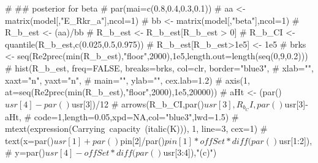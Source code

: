 \documentclass[
  11pt,
]{article}
\newenvironment{Shaded}{}{}
\newcommand{\CommentTok}[1]{\textcolor[rgb]{0.00,0.50,0.00}{#1}}
\begin{document}
\begin{Shaded}
\begin{Highlighting}[]
\CommentTok{# ## posterior for beta}
\CommentTok{# par(mai=c(0.8,0.4,0.3,0.1))}
\CommentTok{# aa <- matrix(model[,"E_Rkr_a"],ncol=1)}
\CommentTok{# bb <- matrix(model[,"beta"],ncol=1)}
\CommentTok{# R_b_est <- (aa)/bb}
\CommentTok{# R_b_est <- R_b_est[R_b_est > 0]}
\CommentTok{# R_b_CI <- quantile(R_b_est,c(0.025,0.5,0.975))}
\CommentTok{# R_b_est[R_b_est>1e5] <- 1e5}
\CommentTok{# brks <- seq(Re2prec(min(R_b_est),"floor",2000),1e5,length.out=length(seq(0,9,0.2)))}
\CommentTok{# hist(R_b_est, freq=FALSE, breaks=brks, col=clr, border="blue3",}
\CommentTok{#    xlab="", xaxt="n", yaxt="n",}
\CommentTok{#    main="", ylab="", cex.lab=1.2)}
\CommentTok{# axis(1, at=seq(Re2prec(min(R_b_est),"floor",2000),1e5,20000))}
\CommentTok{# aHt <- (par()$usr[4]-par()$usr[3])/12}
\CommentTok{# arrows(R_b_CI,par()$usr[3],R_b_CI,par()$usr[3]-aHt,}
\CommentTok{#        code=1,length=0.05,xpd=NA,col="blue3",lwd=1.5)}
\CommentTok{# mtext(expression(Carrying~capacity~(italic(K))), 1, line=3, cex=1)}
\CommentTok{# text(x=par()$usr[1]+par()$pin[2]/par()$pin[1]*offSet*diff(par()$usr[1:2]),}
\CommentTok{#    y=par()$usr[4]-offSet*diff(par()$usr[3:4]),"(c)")}


\end{Highlighting}
\end{Shaded}
\end{document}
